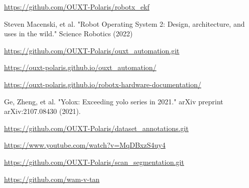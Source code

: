 \documentclass[lettersize,journal]{IEEEtran}
\begin{document}
\begin{thebibliography}{1}

    \url{https://github.com/OUXT-Polaris/robotx_ekf}

    Steven Macenski, et al. "Robot Operating System 2: Design, architecture, and uses in the wild." Science Robotics (2022)

    \url{https://github.com/OUXT-Polaris/ouxt_automation.git}

    \url{https://ouxt-polaris.github.io/ouxt_automation/}

    \url{https://ouxt-polaris.github.io/robotx-hardware-documentation/}

    Ge, Zheng, et al. "Yolox: Exceeding yolo series in 2021." arXiv preprint arXiv:2107.08430 (2021).

    \url{https://github.com/OUXT-Polaris/dataset_annotations.git}

    \url{https://www.youtube.com/watch?v=MqDBxzS4uy4}

    \url{https://github.com/OUXT-Polaris/scan_segmentation.git}

    \url{https://github.com/wam-v-tan}

\end{thebibliography}

\vfill
\end{document}
